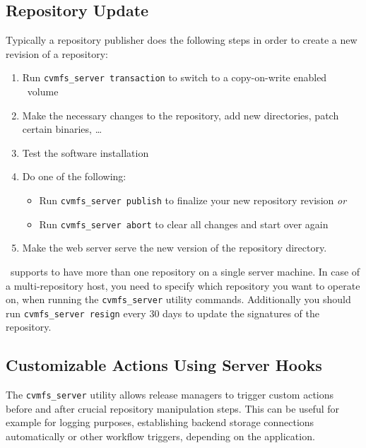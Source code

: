 \subsection{Repository Update}
\label{sct:repoupdateprocedure}
Typically a repository publisher does the following steps in order to create a new revision of a repository:
\begin{enumerate}
	\item Run \texttt{cvmfs\_server transaction} to switch to a copy-on-write enabled \cvmfs\ volume
	\item Make the necessary changes to the repository, \eg add new directories, patch certain binaries, \dots
	\item Test the software installation
	\item Do one of the following:
	\begin{itemize}
		\item Run \texttt{cvmfs\_server publish} to finalize your new repository revision \emph{or}
		\item Run \texttt{cvmfs\_server abort} to clear all changes and start over again
	\end{itemize}
	\item Make the web server serve the new version of the repository directory.
\end{enumerate}

\cvmfs\ supports to have more than one repository on a single server machine.
In case of a multi-repository host, you need to specify which repository you want to operate on, when running the \texttt{cvmfs\_server} utility commands.
Additionally you should run \texttt{cvmfs\_server resign} every 30 days to update the signatures of the repository.

\subsection{Customizable Actions Using Server Hooks}
The \texttt{cvmfs\_server} utility allows release managers to trigger custom actions before and after crucial repository manipulation steps. This can be useful for example for logging purposes, establishing backend storage connections automatically or other workflow triggers, depending on the application.

